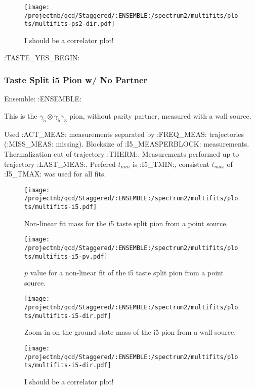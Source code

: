 \begin{figure}[H]
\centering
\texttt{[image: /projectnb/qcd/Staggered/:ENSEMBLE:/spectrum2/multifits/plots/multifits-ps2-dir.pdf]}
\caption{I should be a correlator plot!}
\end{figure}

\clearpage

:TASTE_YES_BEGIN:
\subsubsection{Taste Split i5 Pion w/ No Partner}

Ensemble: :ENSEMBLE:

This is the $\gamma_5 \otimes \gamma_5 \gamma_3$ pion, without parity partner, measured with a wall source. 

{\small{Used :ACT_MEAS: measurements separated by :FREQ_MEAS: trajectories (:MISS_MEAS: missing). Blocksize of :I5_MEASPERBLOCK: measurements. Thermalization cut of trajectory :THERM:. Measurements performed up to trajectory :LAST_MEAS:. Prefered $t_{min}$ is :I5_TMIN:, consistent $t_{max}$ of :I5_TMAX: was used for all fits.}}

\begin{multicols}{2}
\begin{figure}[H]
\centering
\texttt{[image: /projectnb/qcd/Staggered/:ENSEMBLE:/spectrum2/multifits/plots/multifits-i5.pdf]}
\caption{Non-linear fit mass for the i5 taste split pion from a point source.}
\end{figure}
\columnbreak
\begin{figure}[H]
\centering
\texttt{[image: /projectnb/qcd/Staggered/:ENSEMBLE:/spectrum2/multifits/plots/multifits-i5-pv.pdf]}
\caption{$p$ value for a non-linear fit of the i5 taste split pion from a point source.}
\end{figure}
\end{multicols}


\begin{figure}[H]
\centering
\texttt{[image: /projectnb/qcd/Staggered/:ENSEMBLE:/spectrum2/multifits/plots/multifits-i5-dir.pdf]}
\caption{Zoom in on the ground state mass of the i5 pion from a wall source.}
\end{figure}

\begin{figure}[H]
\centering
\texttt{[image: /projectnb/qcd/Staggered/:ENSEMBLE:/spectrum2/multifits/plots/multifits-i5-dir.pdf]}
\caption{I should be a correlator plot!}
\end{figure}

